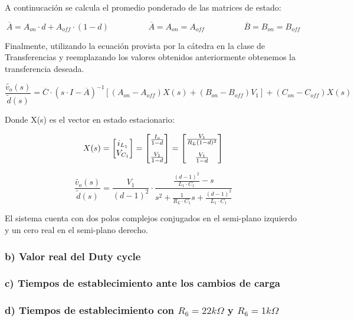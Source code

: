 \documentclass[e4_tp2_main.tex]{subfiles}
\begin{document}
A continucaci\'on se calcula el promedio ponderado de las matrices de estado:

\begin{equation}
\overline{A} = A_{on} \cdot d + A_{off} \cdot (1-d) \hspace{2cm} \overline{A}=A_{on} = A_{off}  \hspace{2cm} \overline{B}=B_{on} = B_{off}  
\end{equation}

Finalmente, utilizando la ecuaci\'on provista por la c\'atedra en la clase de Transferencias y reemplazando los valores obtenidos anteriormente obtenemos la transferencia deseada. 

\begin{equation}
\frac{ \widetilde{v_o}(s)}{\widetilde{d}(s)}= \overline{C} \cdot (s \cdot I - \overline{A})^{-1} \left[ (A_{on} - A_{off})X(s) + (B_{on} - B_{off}) V_1 \right] +(C_{on} - C_{off})X(s) 
\label{ec1.3}
\end{equation}

Donde X(s) es el vector en estado estacionario:

\begin{equation}
X(s)= 
\begin{bmatrix}
{i_{L_1}} \\
{V_{C_1}} 
\end{bmatrix}
=
\begin{bmatrix}
{\frac{I_o}{1-d}} \vspace{0.3cm} \\
{\frac{V_1}{1-d}} 
\end{bmatrix}
=
\begin{bmatrix}
{\frac{V_1}{R_L(1-d)^2}} \vspace{0.3cm} \\
{\frac{V_1}{1-d}} 
\end{bmatrix}
\end{equation}

\vspace{0.5cm}

\begin{equation}
\frac{ \widetilde{v_o}(s)}{\widetilde{d}(s)}= \frac{V_1}{(d-1)^2} \cdot
 \frac{\frac{(d-1)^2}{L_1 \cdot C_1} -s}{s^2 +\frac{1}{R_L \cdot C_1 } s + \frac{(d-1)^2}{L_1 \cdot C_1}}
\end{equation}

El sistema cuenta con dos polos complejos conjugados en el semi-plano izquierdo y un cero real en el semi-plano derecho.
\subsubsection*{b) Valor real del Duty cycle}

\subsubsection*{c) Tiempos de establecimiento ante los cambios de carga }
\subsubsection*{d) Tiempos de establecimiento con $R_6=22k\Omega$ y $R_6=1k\Omega$}
\end{document}
